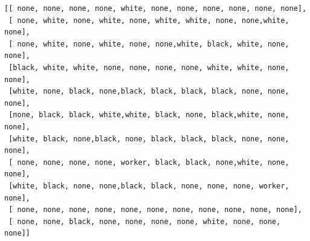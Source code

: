 \documentclass[a4paper]{article}
\begin{document}
\begin{small}
\begin{lstlisting}
[[ none, none, none, none, white, none, none, none, none, none, none],
 [ none, white, none, white, none, white, white, none, none,white, none],
 [ none, white, none, white, none, none,white, black, white, none, none],
 [black, white, white, none, none, none, none, white, white, none, none],
 [white, none, black, none,black, black, black, black, none, none, none],
 [none, black, black, white,white, black, none, black,white, none, none],
 [white, black, none,black, none, black, black, black, none, none, none],
 [ none, none, none, none, worker, black, black, none,white, none, none],
 [white, black, none, none,black, black, none, none, none, worker, none],
 [ none, none, none, none, none, none, none, none, none, none, none],
 [ none, none, black, none, none, none, none, white, none, none, none]]
\end{lstlisting}
\end{small}
\end{document}
